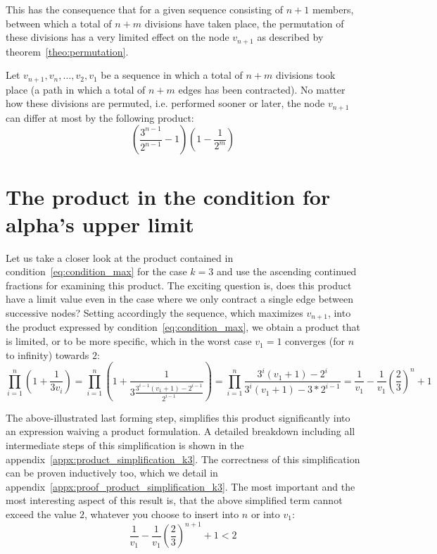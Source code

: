 This has the consequence that for a given sequence consisting of $n+1$ members, between which a total of $n+m$ divisions have taken place, the permutation of these divisions has a very limited effect on the node $v_{n+1}$ as described by theorem~\ref{theo:permutation}.

\par\medskip
\begin{theorem}
	\label{theo:permutation}
	Let $v_{n+1},v_n,\ldots,v_2,v_1$ be a sequence in which a total of $n+m$ divisions took place (a path in which a total of $n+m$ edges has been contracted). No matter how these divisions are permuted, i.e. performed sooner or later, the node $v_{n+1}$ can differ at most by the following product:
	\[
	\left(\frac{3^{n-1}}{2^{n-1}}-1\right)\left(1-\frac{1}{2^m}\right)
	\]
\end{theorem}

\section{The product in the condition for alpha's upper limit}
Let us take a closer look at the product contained in condition~\ref{eq:condition_max} for the case $k=3$ and use the ascending continued fractions for examining this product. The exciting question is, does this product have a limit value even in the case where we only contract a single edge between successive nodes? Setting accordingly the sequence, which maximizes $v_{n+1}$, into the product expressed by condition~\ref{eq:condition_max}, we obtain a product that is limited, or to be more specific, which in the worst case $v_1=1$ converges (for $n$ to infinity) towards $2$:
\begin{equation}
\label{eq:product_simplification_k3}
\prod_{i=1}^{n}\left(1+\frac{1}{3v_{i}}\right)
=\prod_{i=1}^{n}\left(1+\frac{1}{3\frac{3^{i-1}(v_1+1)-2^{i-1}}{2^{i-1}}}\right)
=\prod_{i=1}^{n}\frac{3^i(v_1+1)-2^i}{3^i(v_1+1)-3*2^{i-1}}
=\frac{1}{v_1}-\frac{1}{v_1}\left(\frac{2}{3}\right)^n+1
\end{equation}

The above-illustrated last forming step, simplifies this product significantly into an expression waiving a product formulation. A detailed breakdown including all intermediate steps of this simplification is shown in the appendix~\ref{appx:product_simplification_k3}. The correctness of this simplification can be proven inductively too, which we detail in appendix~\ref{appx:proof_product_simplification_k3}. The most important and the most interesting aspect of this result is, that the above simplified term cannot exceed the value $2$, whatever you choose to insert into $n$ or into $v_1$:
\[
\frac{1}{v_1}-\frac{1}{v_1}\left(\frac{2}{3}\right)^{n+1}+1<2
\]

